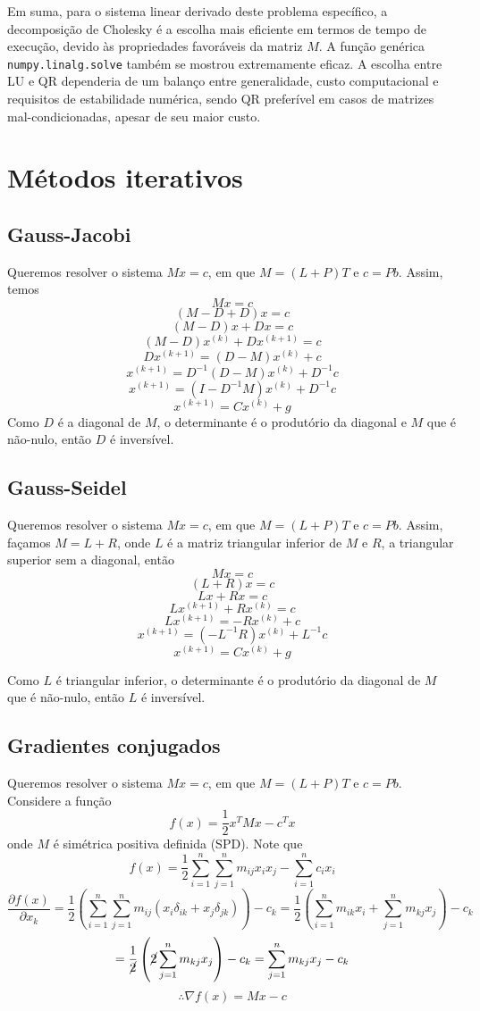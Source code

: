 \documentclass{article}
\begin{document}
    Em suma, para o sistema linear derivado deste problema específico, a decomposição de Cholesky é a escolha mais eficiente em termos de tempo de execução, devido às propriedades favoráveis da matriz $M$. A função genérica \texttt{numpy.linalg.solve} também se mostrou extremamente eficaz. A escolha entre LU e QR dependeria de um balanço entre generalidade, custo computacional e requisitos de estabilidade numérica, sendo QR preferível em casos de matrizes mal-condicionadas, apesar de seu maior custo.

    \newpage

    \section{Métodos iterativos}

    \subsection{Gauss-Jacobi}
    Queremos resolver o sistema $Mx = c$, em que $M = (L+P)T$ e $c = Pb$. Assim, temos
    \[Mx = c\]
    \[(M-D+D)x = c\]
    \[(M-D)x + Dx = c\]
    \[(M-D)x^{(k)} + Dx^{(k+1)} = c\]
    \[Dx^{(k+1)} = (D-M)x^{(k)} + c\]
    \[x^{(k+1)} = D^{-1}(D-M)x^{(k)}+D^{-1}c\]
    \[x^{(k+1)} = (I-D^{-1}M)x^{(k)}+D^{-1}c\]
    \[x^{(k+1)} = Cx^{(k)} + g\]
    Como $D$ é a diagonal de $M$, o determinante é o produtório da diagonal e $M$ que é não-nulo, então $D$ é inversível.

    \subsection{Gauss-Seidel}
    Queremos resolver o sistema $Mx = c$, em que $M = (L+P)T$ e $c = Pb$. Assim, façamos $M = L+R$, onde $L$ é a matriz triangular inferior de $M$ e $R$, a triangular superior sem a diagonal, então
    \[Mx = c\]
    \[(L+R)x = c\]
    \[Lx + Rx = c\]
    \[Lx^{(k+1)} + Rx^{(k)} = c\]
    \[Lx^{(k+1)} = - Rx^{(k)} + c\]
    \[x^{(k+1)} = (-L^{-1}R)x^{(k)} + L^{-1}c\]
    \[x^{(k+1)} = Cx^{(k)} + g\]

    Como $L$ é triangular inferior, o determinante é o produtório da diagonal de $M$ que é não-nulo, então $L$ é inversível.

    \subsection{Gradientes conjugados}
    Queremos resolver o sistema $Mx = c$, em que $M = (L+P)T$ e $c = Pb$. Considere a função
    \[f(x) = \frac{1}{2}x^TMx - c^Tx\]
    onde $M$ é simétrica positiva definida (SPD). Note que
    \[f(x) = \frac{1}{2} \sum_{i=1}^{n}\sum_{j=1}^{n} m_{ij} x_{i} x_{j} - \sum_{i=1}^{n} c_{i} x_{i}\]
    \[\frac{\partial f(x)}{\partial x_k} = \frac{1}{2} \left( \sum_{i=1}^{n}\sum_{j=1}^{n} m_{ij} (x_{i} \delta_{ik} + x_{j} \delta_{jk}) \right) - c_k = \frac{1}{2} \left( \sum_{i=1}^{n} m_{ik} x_{i} + \sum_{j=1}^{n} m_{kj} x_{j} \right) - c_k\]
    \[= \frac{1}{\cancel{2}} \left( \cancel{2} \sum_{j=1}^{n} m_{kj} x_{j} \right) - c_k = \sum_{j=1}^{n} m_{kj} x_{j} - c_k\]
    \[\therefore \nabla f(x) = Mx - c\]
\end{document}
